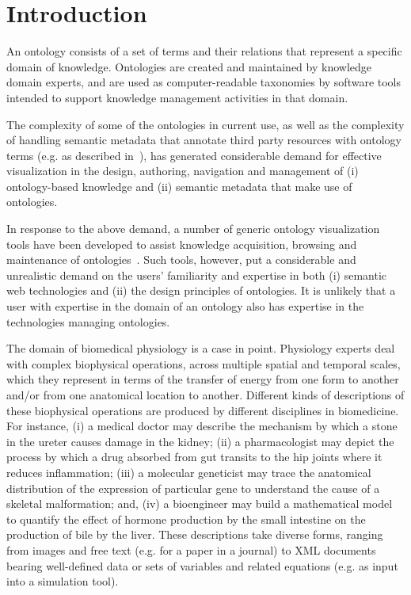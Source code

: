 \section{Introduction}

An ontology consists of a set of terms and their relations that represent a specific domain of knowledge. Ontologies are created and maintained by knowledge domain experts, and are used as computer-readable taxonomies by software tools intended to support knowledge management activities in that domain.

The complexity of some of the ontologies in current use, as well as the complexity of handling semantic metadata that annotate third party resources with ontology terms (e.g. as described in~\cite{BHW+11}), has generated considerable demand for effective visualization in the design, authoring, navigation and management of (i) ontology-based knowledge and (ii) semantic metadata that make use of ontologies.

In response to the above demand, a number of generic ontology visualization tools have been developed to assist knowledge acquisition, browsing and maintenance of ontologies~\cite{KHL+07}. Such tools, however, put a considerable and unrealistic demand on the users' familiarity and expertise in both (i) semantic web technologies and (ii) the design principles of ontologies. It is unlikely that a user with expertise in the domain of an ontology also has expertise in the technologies managing ontologies.

The domain of biomedical physiology is a case in point. Physiology experts deal with complex biophysical operations, across multiple spatial and temporal scales, which they represent in terms of the transfer of energy from one form to another and/or from one anatomical location to another. Different kinds of descriptions of these biophysical operations are produced by different disciplines in biomedicine. For instance, (i) a medical doctor may describe the mechanism by which a stone in the ureter causes damage in the kidney; (ii) a pharmacologist may depict the process by which a drug absorbed from gut transits to the hip joints where it reduces inflammation; (iii) a molecular geneticist may trace the anatomical distribution of the expression of particular gene to understand the cause of a skeletal malformation; and, (iv) a bioengineer may build a mathematical model to quantify the effect of hormone production by the small intestine on the production of bile by the liver. These descriptions take diverse forms, ranging from images and free text (e.g. for a paper in a journal) to XML documents bearing well-defined data or sets of variables and related equations (e.g. as input into a simulation tool).

